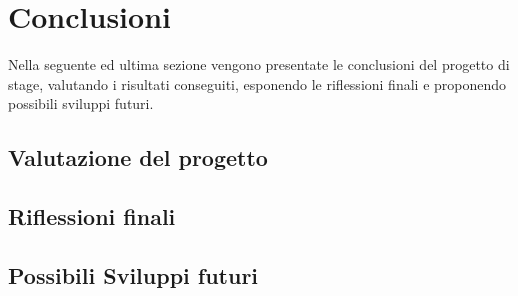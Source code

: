 \chapter{Conclusioni}
\label{chap:conclusioni}
Nella seguente ed ultima sezione vengono presentate le conclusioni del progetto di stage, valutando i risultati conseguiti, esponendo
le riflessioni finali e proponendo possibili sviluppi futuri.

\section{Valutazione del progetto}

\section{Riflessioni finali}

\section{Possibili Sviluppi futuri}